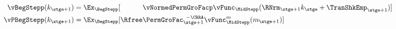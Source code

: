   \begin{equation}\begin{gathered}\begin{aligned}
        \vBegStepp({k}_{\stge+1})  & = \Ex_{\BegStepp}[\phantom{\Rfree}\vNormedPermGroFacp\null{\vFunc}_{\MidStepp}(\RNrm_{\stge+1}{k}_{\stge}+{\TranShkEmp}_{\stge+1})]  \label{eq:vFuncBegtpdefn}
\\  {\vPBegStepp}({k}_{\stge+1})  & = \Ex_{\BegStepp}[\Rfree \PermGroFac_{\stge+1}^{\phantom{1}-\CRRA} \null{\vFunc}_{\MidStepp}^{{m}}({m}_{\stge+1})]
  \end{aligned}\end{gathered}\end{equation}

